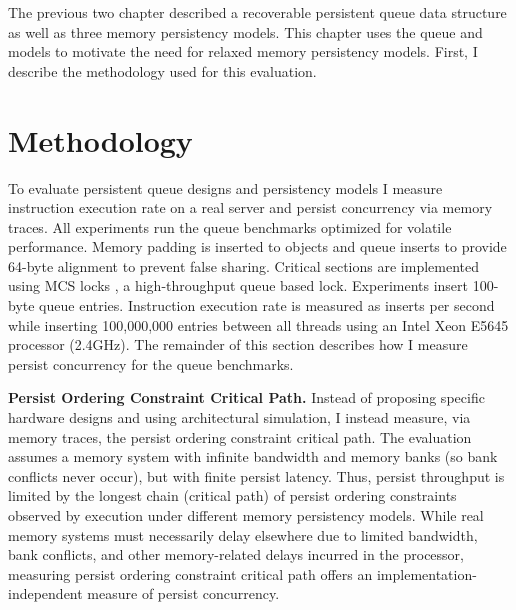 The previous two chapter described a recoverable persistent queue data structure as well as three memory persistency models.
This chapter uses the queue and models to motivate the need for relaxed memory persistency models.
First, I describe the methodology used for this evaluation.

\section{Methodology}
\label{sec:PersistencyEval:Methodology}

To evaluate persistent queue designs and persistency models I measure instruction execution rate on a real server and persist concurrency via memory traces.
All experiments run the queue benchmarks optimized for volatile performance.
Memory padding is inserted to objects and queue inserts to provide 64-byte alignment to prevent false sharing.
Critical sections are implemented using MCS locks \cite{Mellor-Crummey91}, a high-throughput queue based lock.
Experiments insert 100-byte queue entries.
Instruction execution rate is measured as inserts per second while inserting 100,000,000 entries between all threads using an Intel Xeon E5645 processor (2.4GHz).
The remainder of this section describes how I measure persist concurrency for the queue benchmarks.

\textbf{Persist Ordering Constraint Critical Path.}
Instead of proposing specific hardware designs and using architectural simulation, I instead measure, via memory traces, the persist ordering constraint critical path.
The evaluation assumes a memory system with infinite bandwidth and memory banks (so bank conflicts never occur), but with finite persist latency.
Thus, persist throughput is limited by the longest chain (critical path) of persist ordering constraints observed by execution under different memory persistency models.
While real memory systems must necessarily delay elsewhere due to limited bandwidth, bank conflicts, and other memory-related delays incurred in the processor, measuring persist ordering constraint critical path offers an implementation-independent measure of persist concurrency.

